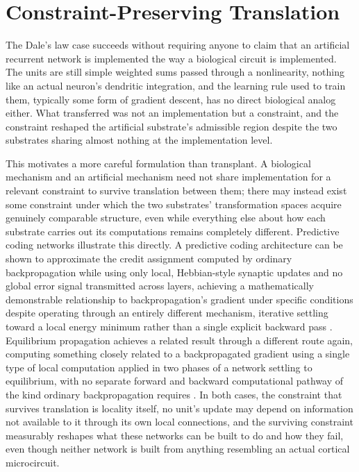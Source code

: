 \documentclass[11pt]{book}
\begin{document}
\section{Constraint-Preserving Translation}

The Dale's law case succeeds without requiring anyone to claim that an artificial recurrent network is implemented the way a biological circuit is implemented. The units are still simple weighted sums passed through a nonlinearity, nothing like an actual neuron's dendritic integration, and the learning rule used to train them, typically some form of gradient descent, has no direct biological analog either. What transferred was not an implementation but a constraint, and the constraint reshaped the artificial substrate's admissible region despite the two substrates sharing almost nothing at the implementation level.

This motivates a more careful formulation than transplant. A biological mechanism and an artificial mechanism need not share implementation for a relevant constraint to survive translation between them; there may instead exist some constraint under which the two substrates' transformation spaces acquire genuinely comparable structure, even while everything else about how each substrate carries out its computations remains completely different. Predictive coding networks illustrate this directly. A predictive coding architecture can be shown to approximate the credit assignment computed by ordinary backpropagation while using only local, Hebbian-style synaptic updates and no global error signal transmitted across layers, achieving a mathematically demonstrable relationship to backpropagation's gradient under specific conditions despite operating through an entirely different mechanism, iterative settling toward a local energy minimum rather than a single explicit backward pass \cite{whittington2017}. Equilibrium propagation achieves a related result through a different route again, computing something closely related to a backpropagated gradient using a single type of local computation applied in two phases of a network settling to equilibrium, with no separate forward and backward computational pathway of the kind ordinary backpropagation requires \cite{scellier2017}. In both cases, the constraint that survives translation is locality itself, no unit's update may depend on information not available to it through its own local connections, and the surviving constraint measurably reshapes what these networks can be built to do and how they fail, even though neither network is built from anything resembling an actual cortical microcircuit.
\end{document}
